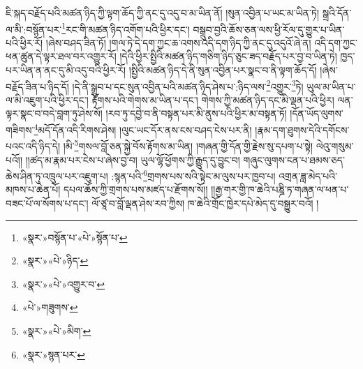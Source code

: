 ཇི་སྐད་བརྗོད་པའི་མཚན་ཉིད་ཀྱི་ལྟག་ཆོད་ཀྱི་ནང་དུ་འདུ་བ་མ་ཡིན་ནོ། །སུན་འབྱིན་པ་ཡང་མ་ཡིན་ཏེ། སྒྲའི་དོན་ལ་མི་:བསྙོན་པར་\footnote{«སྣར་»བསྙོན་པ་«པེ་»སྙོན་པ་}རང་གི་མཚན་ཉིད་འགོག་པའི་ཕྱིར་དང་། བསྒྲུབ་བྱའི་ཆོས་ཅན་ལས་ཕྱི་རོལ་དུ་གྱུར་པ་ཡིན་པའི་ཕྱིར་རོ། །ཞེས་བཤད་ཟིན་ཏོ། །གལ་ཏེ་དེ་དག་ཀྱང་ཆ་འགས་འདི་དག་ཉིད་ཀྱི་ནང་དུ་འདུའོ་ཞེ་ན། འདི་དག་ཀྱང་ཕན་ཚུན་དེ་ལྟར་ཐལ་བར་འགྱུར་རོ། །དེའི་ཕྱིར་སྤྱིའི་མཚན་ཉིད་གཅིག་ཉིད་ཅུང་ཟད་བརྗོད་པར་བྱ་བ་ཡིན་ཏེ། ཁྱད་པར་ཡིན་ན་ནང་དུ་མི་འདུ་བའི་ཕྱིར་རོ། །སྤྱིའི་མཚན་ཉིད་དེ་ནི་སུན་འབྱིན་པར་སྣང་བ་ནི་ལྟག་ཆོད་དོ། །ཞེས་བརྗོད་ཟིན་པ་ཉིད་དོ། །དེ་ནི་སྒྲུབ་པ་དང་སུན་འབྱིན་པའི་མཚན་ཉིད་ཤེས་པ་:ཉིད་ལས་\footnote{«སྣར་»«པེ་»ཉིད་}འགྱུར་\footnote{«སྣར་»«པེ་»འགྱུར་བ་}ཏེ། ཡུལ་མ་ཡིན་པ་ལ་མི་འཇུག་པའི་ཕྱིར་དང་། རྟོགས་པའི་གེགས་མ་ཡིན་པ་དང་། གེགས་ཀྱི་མཚན་ཉིད་དང་མི་ལྡན་པའི་ཕྱིར། ལན་ལྟར་སྣང་བ་བདེ་བླག་ཏུ་ཤེས་སོ། །རབ་ཏུ་དབྱེ་བ་ནི་བསྟན་པར་མི་ནུས་པའི་ཕྱིར་མ་བསྟན་ཏོ། །དོན་ཡོད་ལུགས་གཟིགས་\footnote{«པེ་»གཟུགས་}མདོ་དོན་འདི་རིགས་ཤེས། །ལུང་ཡང་དོར་ནས་ངས་བཤད་ངེས་པར་ནི། །རྣམ་དག་ཐུགས་དེའི་དགོངས་པའང་འདི་ཉིད་དེ། །མི་\footnote{«སྣར་»«པེ་»མིག་}གསལ་བློ་ཅན་སྐྱེ་བོས་རྟོགས་མ་ཡིན། །གཞན་གྱི་དོན་གྱི་རྗེས་སུ་དཔག་པ་སྟེ། ལེའུ་གསུམ་པའོ།། །།ཚད་མ་རྣམ་པར་ངེས་པ་ཞེས་བྱ་བ། ཡུལ་ལྷོ་ཕྱོགས་ཀྱི་རྒྱུད་དུ་བྱུང་བ། གཞུང་ལུགས་ངན་པ་ཐམས་ཅད་ཆེས་ཤིན་ཏུ་འཁྲུལ་པར་འཇུག་པ། :སྙན་པའི་\footnote{«སྣར་»སྙན་པར་}གྲགས་པས་སའི་སྟེང་མ་ལུས་པར་ཁྱབ་པ། འགྲན་ཟླ་མེད་པའི་མཁས་པ་ཆེན་པོ། དཔལ་ཆོས་ཀྱི་གྲགས་པས་མཛད་པ་རྫོགས་སོ།། །།རྒྱ་གར་གྱི་ཁ་ཆེའི་པཎྜི་ཏ་གཞན་ལ་ཕན་པ་བཟང་པོ་ལ་སོགས་པ་དང་། ལོ་ཙཱ་བ་བློ་ལྡན་ཤེས་རབ་ཀྱིས། ཁ་ཆེའི་གྲོང་ཁྱེར་དཔེ་མེད་དུ་བསྒྱུར་བའོ། །